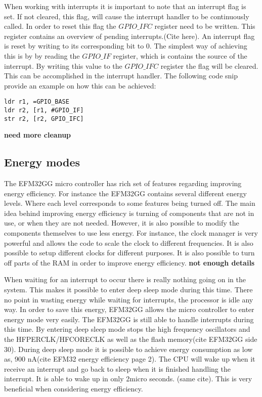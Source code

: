 When working with interrupts it is important to note that an interrupt flag is set. If not cleared, this flag, will cause the interrupt handler to be continuously called. In order to reset this flag the $GPIO\_IFC$ register need to be written. This register contains an overview of pending interrupts.(Cite here). An interrupt flag is reset by writing to its corresponding bit to 0.  The simplest way of achieving this is by by reading the $GPIO\_IF$ register, which is contains the source of the interrupt. By writing this value to the $GPIO\_IFC$ register the flag will be cleared.  This can be accomplished in the interrupt handler. The following code snip provide an example on how this can be achieved:

\begin{lstlisting}
ldr r1, =GPIO_BASE
ldr r2, [r1, #GPIO_IF]
str r2, [r2, GPIO_IFC]
\end{lstlisting}
 
{\bf need more cleanup}




\subsection{Energy modes}\label{ch:energy_modes} 
The EFM32GG micro controller has rich set of features regarding improving energy efficiency. For instance the EFM32GG contains several different energy levels. Where each level corresponds to some features being turned off. The main idea behind improving energy efficiency is turning of components that are not in use, or when they are not needed. However, it is also possible to modify the components themselves to use less energy. For instance, the clock manager is very powerful and allows the code to scale the clock to different frequencies. It is also possible to setup different clocks for different purposes. It is also possible to turn off parts of the RAM in order to improve energy efficiency. {\bf not enough details}


When waiting for an interrupt to occur there is really nothing going on in the system. This makes it possible to enter deep sleep mode during this time. There no point in wasting energy while waiting for interrupts, the processor is idle any way. In order to save this energy, EFM32GG allows the micro controller to enter energy mode very easily. The EFM32GG is still able to handle interrupts during this time. By entering deep sleep mode stops the high frequency oscillators and the HFPERCLK/HFCORECLK as well as the flash memory(cite EFM32GG side 30). During deep sleep mode it is possible to achieve energy consumption as low as, 900 nA(cite EFM32 energy efficiency page 2). The CPU will wake up when it receive an interrupt and go back to sleep when it is finished handling the interrupt. It is able to wake up in only 2micro seconds. (same cite). This is very beneficial when considering energy efficiency.   

